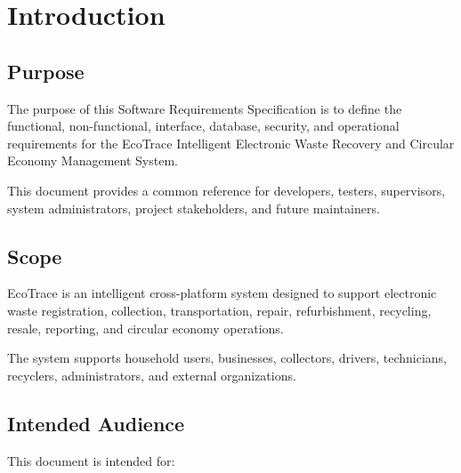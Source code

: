 \chapter{Introduction}
\label{chap:introduction}

\section{Purpose}
\label{sec:srs-purpose}

The purpose of this Software Requirements Specification is to define
the functional, non-functional, interface, database, security, and
operational requirements for the EcoTrace Intelligent Electronic Waste
Recovery and Circular Economy Management System.

This document provides a common reference for developers, testers,
supervisors, system administrators, project stakeholders, and future
maintainers.

\section{Scope}
\label{sec:srs-scope}

EcoTrace is an intelligent cross-platform system designed to support
electronic waste registration, collection, transportation, repair,
refurbishment, recycling, resale, reporting, and circular economy
operations.

The system supports household users, businesses, collectors, drivers,
technicians, recyclers, administrators, and external organizations.

\section{Intended Audience}
\label{sec:intended-audience}

This document is intended for:

